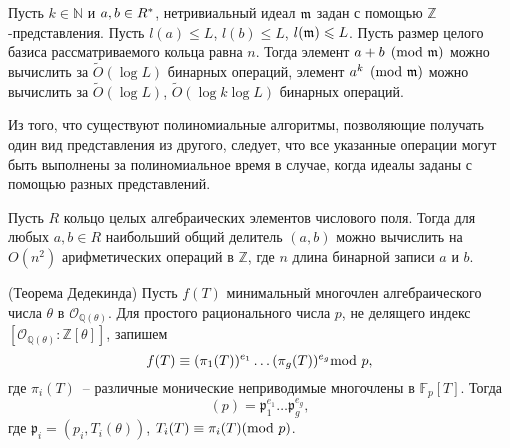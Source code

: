 \documentclass[_00_dissertation.tex]{subfiles}
\begin{document}
\begin{corollary}
    Пусть $k \in \mathbb{N}$ и $a, b \in R^{*}$, нетривиальный идеал $\mathfrak{m}$ задан с помощью $\mathbb{Z}$-представления.
    Пусть $l(a) \leq L$, $l(b) \leq L$, $l(\mathfrak{m}) \leqslant L$.
    Пусть размер целого базиса рассматриваемого кольца равна $n$.
    Тогда элемент $a + b \pmod{\mathfrak{m}}$ можно вычислить за $\tilde{O}(\log L)$ бинарных операций, элемент $a^k \pmod{\mathfrak{m}}$ можно вычислить за $\tilde{O}(\log L)$, $\tilde{O}(\log k \log L)$ бинарных операций.
\end{corollary}

\begin{remark}
    Из того, что существуют полиномиальные алгоритмы, позволяющие получать один вид представления из другого, следует, что все указанные операции могут быть выполнены за полиномиальное время в случае, когда идеалы заданы с помощью разных представлений.
\end{remark}

\begin{statement}\label{statement:GCD_Wikstrom} \cite[с.~1199]{source:Wikstrom}
    Пусть $R$ кольцо целых алгебраических элементов числового поля.
    Тогда для любых $a, b \in R$ наибольший общий делитель $(a, b)$ можно вычислить на $O(n^2)$ арифметических операций в $\mathbb{Z}$, где $n$ длина бинарной записи $a$ и $b$.
\end{statement}

\begin{statement}\label{statement:dedekind} \cite[с.~27]{source:Lang} (Теорема Дедекинда)
    Пусть $f(T)$ минимальный многочлен алгебраического числа $\theta$ в $\mathcal{O}_{\mathbb{Q}(\theta)}$.
    Для простого рационального числа $p$, не делящего индекс $[\mathcal{O}_{\mathbb{Q}(\theta)} : \mathbb{Z}[\theta]]$, запишем
    \begin{equation*}
        f(T) \equiv (\pi_1(T))^{e_1}\dots (\pi_g(T))^{e_g} \textrm{mod } p,
    \end{equation*}
    где $\pi_i(T)$~-- различные монические неприводимые многочлены в $\mathbb{F}_p[T]$.
    Тогда
    \begin{equation*}
        (p) = \mathfrak{p}_1^{e_1}\dots \mathfrak{p}_g^{e_g},
    \end{equation*}
    где $\mathfrak{p}_i = (p_i, T_i(\theta))$, $T_i(T) \equiv \pi_i(T)(\textrm{mod } p)$.
\end{statement}
\end{document}
